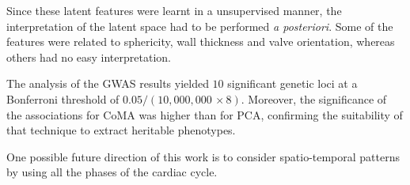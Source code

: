 \documentclass[twocolumn]{llncs}
\newcommand{\NIMP}{10,000,000\,} %
\newcommand{\NGWASHITS}{10}
\begin{document}
Since these latent features were learnt in a unsupervised manner, the interpretation of the latent space had to be performed \emph{a posteriori}. Some of the features were related to sphericity, wall thickness and valve orientation, whereas others had no easy interpretation.

The analysis of the GWAS results yielded $\NGWASHITS$ significant genetic loci at a Bonferroni threshold of $0.05/(\NIMP\times8)$. Moreover, the significance of the associations for CoMA was higher than for PCA, confirming the suitability of that technique to extract heritable phenotypes.

One possible future direction of this work is to consider spatio-temporal patterns by using all the phases of the cardiac cycle.

\newpage

%
% 
% 
%
\end{document}
